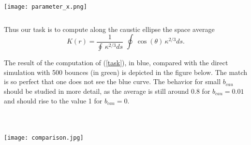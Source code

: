 \documentclass[11pt]{article}
\begin{document}
\newpage


 
\texttt{[image: parameter\_x.png]}

$$ $$

Thus our  task is to compute along the caustic ellipse the space average 
            \begin{equation} \label{task}       K(r) =   \frac{ 1}{\oint \,  \kappa^{2/3}  ds} \,  \, \oint \,   \cos(\theta)\,  \kappa^{2/3} ds  .
            \end{equation}



The result of the computation of (\ref{task}), in blue,  compared with the   direct simulation with 500 bounces  (in green) is depicted in the figure below.  The match
is so perfect that one does not see the blue curve.  The behavior for small  $b_{cau}$   should be studied in more detail, as the average is still around 0.8 for  $b_{cau} =  0.01 $
and should rise  to the value 1  for  $b_{cau} =  0$. \\ \\ \\   \\


\texttt{[image: comparison.jpg]}
\end{document}
